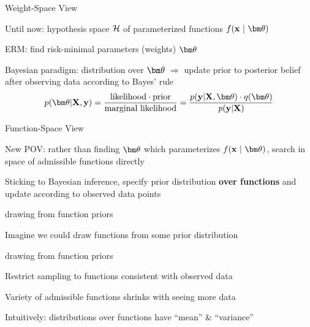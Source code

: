 \documentclass[11pt,compress,t,notes=noshow, xcolor=table]{beamer}
\begin{document}

\begin{framei}[sep=L]{Weight-Space View}
\item Until now: hypothesis space $\mathcal{H}$ of parameterized functions $\fxt$ %
\item ERM: find risk-minimal parameters (weights) $\thetav$
\item Bayesian paradigm: distribution over $\thetav$ $\Rightarrow$ update prior to posterior belief after observing data according to Bayes' rule
$$
p(\thetav | \Xmat, \yv) 
= \frac{\text{likelihood} \cdot \text{prior}}{\text{marginal likelihood}} 
= \frac{p(\yv | \Xmat, \thetav) \cdot q(\thetav)}{p(\yv|\Xmat)}
$$
\end{framei}

\begin{framei}[sep=L]{Function-Space View}
\item New POV: rather than finding $\thetav$ which parameterizes $\fxt$,  search in space of admissible functions directly
\item Sticking to Bayesian inference, specify prior distribution \textbf{over functions} and update according to observed data points
\end{framei}

\begin{framei}{drawing from function priors}
\item Imagine we could draw functions from some prior distribution

\vfill

\end{framei}

\begin{framei}{drawing from function priors}
\item Restrict sampling to functions consistent with observed data
\vfill
{}
\vfill
{}
\item Variety of admissible functions shrinks with seeing more data
\item Intuitively: distributions over functions have ``mean'' \& ``variance''
\end{framei}
\end{document}
